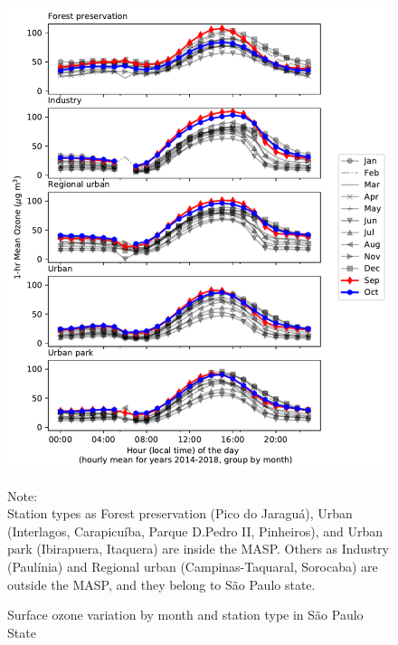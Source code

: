 	\begin{figure}[htbp]
 		\includegraphics[width=1\textwidth]{fig/o3_hourly_type_obs.pdf}
  		\caption{Surface ozone variation by month and station type in São Paulo State}
  		{\scriptsize Note: \\ Station types as Forest preservation (Pico do Jaraguá), Urban (Interlagos, Carapicuíba, Parque D.Pedro II, Pinheiros), and Urban park (Ibirapuera, Itaquera) are inside the MASP.
  		Others as Industry (Paulínia) and Regional urban (Campinas-Taquaral, Sorocaba) are outside the MASP, and they belong to São Paulo state.} 
  		\label{fig:o3_time}
	\end{figure}
	
